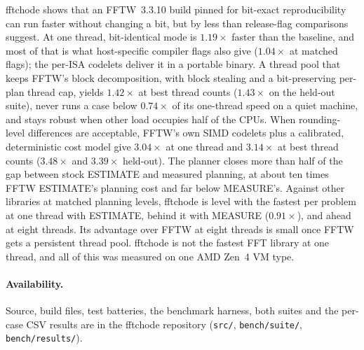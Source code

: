 \documentclass[10pt]{article}
\theoremstyle{definition}
\begin{document}
fftchode shows that an FFTW~3.3.10 build pinned for bit-exact reproducibility can run faster without changing a bit, but by less than release-flag comparisons suggest. At one thread, bit-identical mode is $1.19\times$ faster than the baseline, and most of that is what host-specific compiler flags also give ($1.04\times$ at matched flags); the per-ISA codelets deliver it in a portable binary. A thread pool that keeps FFTW's block decomposition, with block stealing and a bit-preserving per-plan thread cap, yields $1.42\times$ at best thread counts ($1.43\times$ on the held-out suite), never runs a case below $0.74\times$ of its one-thread speed on a quiet machine, and stays robust when other load occupies half of the CPUs. When rounding-level differences are acceptable, FFTW's own SIMD codelets plus a calibrated, deterministic cost model give $3.04\times$ at one thread and $3.14\times$ at best thread counts ($3.48\times$ and $3.39\times$ held-out). The planner closes more than half of the gap between stock ESTIMATE and measured planning, at about ten times FFTW ESTIMATE's planning cost and far below MEASURE's. Against other libraries at matched planning levels, fftchode is level with the fastest per problem at one thread with ESTIMATE, behind it with MEASURE ($0.91\times$), and ahead at eight threads. Its advantage over FFTW at eight threads is small once FFTW gets a persistent thread pool. fftchode is not the fastest FFT library at one thread, and all of this was measured on one AMD Zen~4 VM type.

\paragraph{Availability.} Source, build files, test batteries, the benchmark harness, both suites and the per-case CSV results are in the fftchode repository (\texttt{src/}, \texttt{bench/suite/}, \texttt{bench/results/}).

{\small
}
\end{document}
